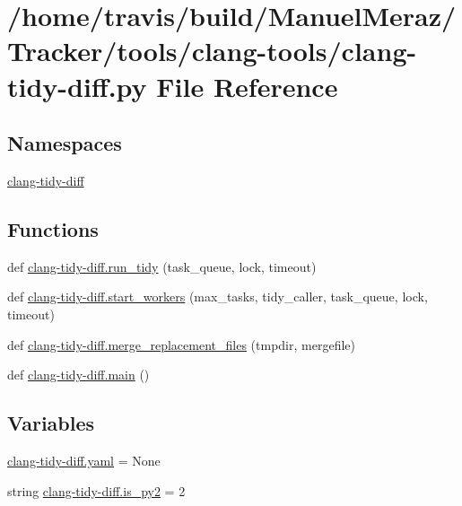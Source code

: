 \hypertarget{clang-tidy-diff_8py}{}\section{/home/travis/build/\+Manuel\+Meraz/\+Tracker/tools/clang-\/tools/clang-\/tidy-\/diff.py File Reference}
\label{clang-tidy-diff_8py}
\subsection*{Namespaces}
\begin{DoxyCompactItemize}
\item 
 \hyperlink{namespaceclang-tidy-diff}{clang-\/tidy-\/diff}
\end{DoxyCompactItemize}
\subsection*{Functions}
\begin{DoxyCompactItemize}
\item 
def \hyperlink{namespaceclang-tidy-diff_adb1dd1ee97acfb72230cf2b781df2fb6}{clang-\/tidy-\/diff.\+run\+\_\+tidy} (task\+\_\+queue, lock, timeout)
\item 
def \hyperlink{namespaceclang-tidy-diff_a0d542cc4870a5b740c01322d164b8d3d}{clang-\/tidy-\/diff.\+start\+\_\+workers} (max\+\_\+tasks, tidy\+\_\+caller, task\+\_\+queue, lock, timeout)
\item 
def \hyperlink{namespaceclang-tidy-diff_a6170ff40bffd6042e1814e05bc306aca}{clang-\/tidy-\/diff.\+merge\+\_\+replacement\+\_\+files} (tmpdir, mergefile)
\item 
def \hyperlink{namespaceclang-tidy-diff_aa8abb872d7196304ade3c25b83bfc0cc}{clang-\/tidy-\/diff.\+main} ()
\end{DoxyCompactItemize}
\subsection*{Variables}
\begin{DoxyCompactItemize}
\item 
\hyperlink{namespaceclang-tidy-diff_a81c8be33496068928a8e245969518c56}{clang-\/tidy-\/diff.\+yaml} = None
\item 
string \hyperlink{namespaceclang-tidy-diff_af226f0f9d8170361a10edb107f5b4345}{clang-\/tidy-\/diff.\+is\+\_\+py2} = \textquotesingle{}2\textquotesingle{}
\end{DoxyCompactItemize}
